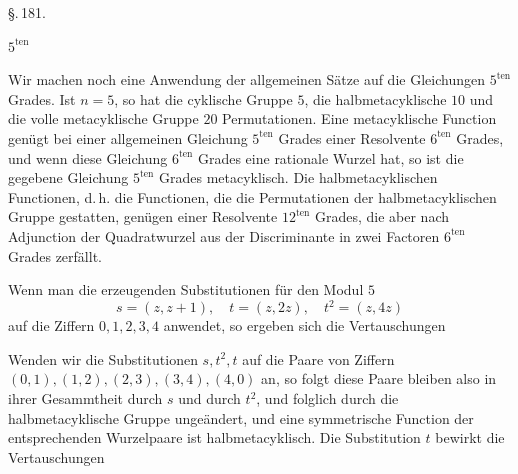 
\begin{center}
\S.\,181.

$5^{\text{ten}}$ 
\end{center}

\quad Wir machen noch eine Anwendung der allgemeinen Sätze
auf die Gleichungen $5^{\text{ten}}$ Grades. Ist $n = 5$, so hat die cyklische
Gruppe $5$, die halbmetacyklische $10$ und die volle metacyklische
Gruppe $20$ Permutationen. Eine metacyklische Function genügt
bei einer allgemeinen Gleichung $5^{\text{ten}}$ Grades einer Resolvente
$6^{\text{ten}}$ Grades, und wenn diese Gleichung $6^{\text{ten}}$ Grades eine rationale
Wurzel hat, so ist die gegebene Gleichung $5^{\text{ten}}$ Grades metacyklisch.
Die halbmetacyklischen Functionen, d.\,h. die Functionen,
die die Permutationen der halbmetacyklischen Gruppe
gestatten, genügen einer Resolvente $12^{\text{ten}}$ Grades, die aber nach
Adjunction der Quadratwurzel aus der Discriminante in zwei
Factoren $6^{\text{ten}}$ Grades zerfällt.

\quad Wenn man die erzeugenden Substitutionen für den Modul $5$
\[
s = (z, z+1),\quad t = (z, 2z),\quad t^2 = (z, 4z)
\]
auf die Ziffern $0, 1, 2, 3, 4$ anwendet, so ergeben sich die Vertauschungen

\quad Wenden wir die Substitutionen $s, t^2, t$ auf die Paare von
Ziffern $(0,1), (1,2), (2,3), (3,4), (4,0)$ an, so folgt
diese Paare bleiben also in ihrer Gesammtheit durch $s$ und
durch $t^2$, und folglich durch die halbmetacyklische Gruppe ungeändert,
und eine symmetrische Function der entsprechenden
Wurzelpaare ist halbmetacyklisch. Die Substitution $t$ bewirkt
die Vertauschungen
